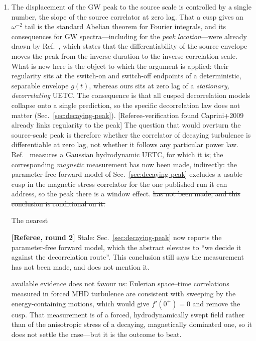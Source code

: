 \documentclass[10pt,prd,aps,nobibnotes,superscriptaddress,preprintnumbers,notitlepage]{revtex4-1}
\newcommand{\rev}[1]{\par\noindent\begin{tcolorbox}[colback=blue!4,colframe=blue!55,
    boxrule=0.5pt,left=3pt,right=3pt,top=2pt,bottom=2pt,breakable]
    \footnotesize\textcolor{blue!65!black}{\textbf{[Referee, round 2]} #1}\end{tcolorbox}\par}
\newcommand{\revX}[1]{\par\noindent\begin{tcolorbox}[colback=red!5,colframe=red!70!black,
    boxrule=1pt,left=3pt,right=3pt,top=2pt,bottom=2pt,breakable]
    \footnotesize\textcolor{red!70!black}{\textbf{[Referee, round 2 --- BLOCKING]} #1}\end{tcolorbox}\par}
\newcommand{\rev}[1]{}\newcommand{\revX}[1]{}
\newcommand{\add}[1]{{\color{red}#1}}
\newcommand{\del}[1]{{\color{red}\sout{#1}}}
\newcommand{\why}[1]{{\color{red}\footnotesize\textsf{[#1]}}}
\newcommand{\add}[1]{#1}
\newcommand{\del}[1]{}
\newcommand{\why}[1]{}
\begin{document}
\begin{enumerate}
  \item The displacement of the GW peak to the source scale is controlled by a single
  number, the slope of the source correlator at zero lag. That a cusp gives an
  $\omega^{-2}$ tail is the standard Abelian theorem for Fourier integrals, and its
  consequences for GW spectra---including for the \emph{peak location}---were already
  drawn by Ref.~\cite{Caprini:2009fx}, which states that the differentiability of the
  source envelope moves the peak from the inverse duration to the inverse correlation
  scale. What is new here is the object to which the argument is applied: their
  regularity sits at the switch-on and switch-off endpoints of a deterministic,
  separable envelope $g(t)$, whereas ours sits at zero lag of a \emph{stationary,
  decorrelating} UETC. The consequence is that all cusped decorrelation models collapse
  onto a single prediction, so the specific decorrelation law does not matter
  (Sec.~\ref{sec:decaying-peak}).
  \why{Referee-verification found Caprini+2009 already links regularity to the peak} The
  question that would overturn the source-scale peak is therefore whether the
  correlator of decaying turbulence is differentiable at zero lag, not whether it
  follows any particular power law. Ref.~\cite{Auclair:2022jod} measures a Gaussian
  hydrodynamic UETC, for which it is; the corresponding \emph{magnetic} measurement
  \add{has now been made, indirectly: the parameter-free forward model of
  Sec.~\ref{sec:decaying-peak} excludes a usable cusp in the magnetic stress correlator
  for the one published run it can address, so the peak there is a window effect.}
  \del{has not been made, and this conclusion is conditional on it.} \add{The nearest
\rev{Stale: Sec.~\ref{sec:decaying-peak} now reports the parameter-free forward model,
which the abstract elevates to ``we decide it against the decorrelation route''. This
conclusion still says the measurement has not been made, and does not mention it.}
  available evidence does not favour us: Eulerian space--time correlations measured in
  forced MHD turbulence \cite{Perez:2020} are consistent with sweeping by the
  energy-containing motions, which would give $f'(0^{+})=0$ and remove the cusp. That
  measurement is of a forced, hydrodynamically swept field rather than of the
  anisotropic stress of a decaying, magnetically dominated one, so it does not settle
  the case---but it is the outcome to beat.}


\end{enumerate}
\end{document}
